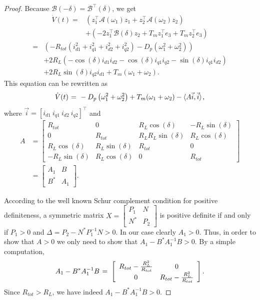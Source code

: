 \documentclass[letterpaper, 10 pt, conference]{ieeeconf}
\renewcommand{\o}    {{\omega}}
\newcommand{\m}      {{\hbox{\hskip 1pt}}}
\begin{document}
\begin{proof}
Because $\mathcal{B}(-\delta) = \mathcal{B}^\top(\delta)$, we get 
$$ \begin{aligned} \dot{V}(t) =& \left(z_1^\top\mathcal{A}(\o_1)
   z_1+z_2^\top\mathcal{A}(\o_2)z_2\right) \\ &+ \left(-2z_1^\top
   \mathcal{B}(\delta)z_2 + T_mz_1^\top e_3+ T_mz_2^\top e_3\right)
   \end{aligned}$$
$$ \begin{aligned} =& \left(-R_{tot}\left(i_{d1}^2 +
   i_{q1}^2+i_{d2}^2+i_{q2}^2 \right)-D_p \left(\o_1^2+\o_2^2\right)
   \right) \\ & +2 R_L \left(-\cos(\delta)i_{d1}i_{d2}-\cos(\delta)
   i_{q1}i_{q2}-\sin(\delta)i_{q1}i_{d2}\right)\\ &+2 R_L
   \sin(\delta)i_{q2}i_{d1} + T_m(\o_1+\o_2).\end{aligned}$$
This equation can be rewritten as
$$ \dot{V}(t) \m=\m -D_p\left( \o_1^2+\o_2^2\right) + T_m(\o_1+\o_2)
   -\langle A\vec{i},\vec{i} \rangle \m,$$ 
where $\vec{i}=[i_{d1}\ i_{q1}\ i_{d2}\ i_{q2}]^\top$ and 
$$ \begin{aligned} A &=\left[\begin{array}{cc|cc} R_{tot} & 0 & R_L 
   \cos(\delta) & -R_L \sin(\delta) \\ 0 & R_{tot} & R_L R_L 
   \sin(\delta) & R_L\cos(\delta) \\ \hline R_L\cos(\delta) & R_L 
   \sin(\delta) & R_{tot} & 0 \\ -R_L \sin(\delta) & R_L\cos(\delta) 
   & 0 & R_{tot} \end{array}\right]\\ &= \left[ \begin{array}{c|c}
   A_1 & B \\ \hline B^* & A_1 \end{array} \right].\end{aligned}$$

According to the well known Schur complement condition for positive
definiteness, a symmetric matrix $X = \left[ \begin{array}{c|c} P_1 &
N \\ \hline N^* & P_2 \end{array}\right]$ is positive definite if and
only if $P_1>0$ and $\Delta=P_2-N^*P_1^{-1}N>0$. In our case clearly
$A_1>0$. Thus, in order to show that $A>0$ we only need to show that 
$A_1-B^*A_1^{-1}B>0$. By a simple computation,
$$ A_1-B^*A_1^{-1}B \m=\m \left[\begin{array}{cc}
   R_{tot}-\frac{R_L^2}{R_{tot}} & 0  \\ 
   0 & R_{tot}-\frac{R_L^2}{R_{tot}} \end{array}\right].$$
Since $R_{tot}>R_L$, we have indeed $A_1-B^*A_1^{-1}B>0$. 


\end{proof}
\end{document}
